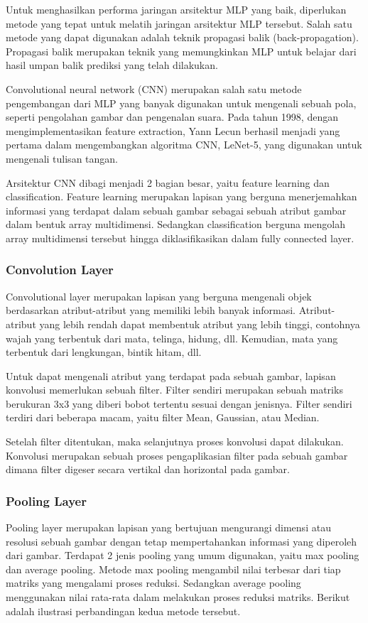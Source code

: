 Untuk menghasilkan performa jaringan arsitektur MLP yang baik, diperlukan metode yang tepat untuk melatih jaringan arsitektur MLP tersebut. Salah satu metode yang dapat digunakan adalah teknik propagasi balik (back-propagation). Propagasi balik merupakan teknik yang memungkinkan MLP untuk belajar dari hasil umpan balik prediksi yang telah dilakukan.

Convolutional neural network (CNN) merupakan salah satu metode pengembangan dari MLP yang banyak digunakan untuk mengenali sebuah pola, seperti pengolahan gambar dan pengenalan suara. Pada tahun 1998, dengan mengimplementasikan feature extraction, Yann Lecun berhasil menjadi yang pertama dalam mengembangkan algoritma CNN, LeNet-5, yang digunakan untuk mengenali tulisan tangan.

Arsitektur CNN dibagi menjadi 2 bagian besar, yaitu feature learning dan classification. Feature learning merupakan lapisan yang berguna menerjemahkan informasi yang terdapat dalam sebuah gambar sebagai sebuah atribut gambar dalam bentuk array multidimensi. Sedangkan classification berguna mengolah array multidimensi tersebut hingga diklasifikasikan dalam fully connected layer.

\subsubsection{Convolution Layer}
Convolutional layer merupakan lapisan yang berguna mengenali objek berdasarkan atribut-atribut yang memiliki lebih banyak informasi. Atribut-atribut yang lebih rendah dapat membentuk atribut yang lebih tinggi, contohnya wajah yang terbentuk dari mata, telinga, hidung, dll. Kemudian, mata yang terbentuk dari lengkungan, bintik hitam, dll.

Untuk dapat mengenali atribut yang terdapat pada sebuah gambar, lapisan konvolusi memerlukan sebuah filter. Filter sendiri merupakan sebuah matriks berukuran 3x3 yang diberi bobot tertentu sesuai dengan jenisnya. Filter sendiri terdiri dari beberapa macam, yaitu filter Mean, Gaussian, atau Median.

Setelah filter ditentukan, maka selanjutnya proses konvolusi dapat dilakukan. Konvolusi merupakan sebuah proses pengaplikasian filter pada sebuah gambar dimana filter digeser secara vertikal dan horizontal pada gambar.

\subsubsection{Pooling Layer}
Pooling layer merupakan lapisan yang bertujuan mengurangi dimensi atau resolusi sebuah gambar dengan tetap mempertahankan informasi yang diperoleh dari gambar. Terdapat 2 jenis pooling yang umum digunakan, yaitu max pooling dan average pooling. Metode max pooling mengambil nilai terbesar dari tiap matriks yang mengalami proses reduksi. Sedangkan average pooling menggunakan nilai rata-rata dalam melakukan proses reduksi matriks. Berikut adalah ilustrasi perbandingan kedua metode tersebut.

